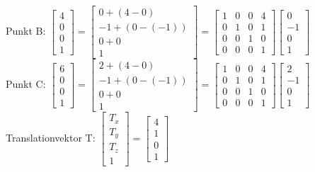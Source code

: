 \documentclass[11pt, a4paper]{article} %
\begin{document}
Punkt B: $\begin{bmatrix}
	4 \\ 0 \\ 0 \\ 1
\end{bmatrix} = \begin{bmatrix}
	0+(4-0) \\ -1+(0-(-1)) \\ 0+0 \\ 1
\end{bmatrix} = \begin{bmatrix}
	1 & 0 & 0 & 4 \\ 0 & 1 & 0 & 1 \\ 0 & 0 & 1 & 0 \\ 0 & 0 & 0 & 1
\end{bmatrix} \begin{bmatrix}
	0 \\ -1 \\ 0 \\ 1
\end{bmatrix}$ \\
Punkt C: $\begin{bmatrix}
	6 \\ 0 \\ 0 \\ 1
\end{bmatrix} = \begin{bmatrix}
	2+(4-0) \\ -1+(0-(-1)) \\ 0+0 \\ 1
\end{bmatrix} = \begin{bmatrix}
	1 & 0 & 0 & 4 \\ 0 & 1 & 0 & 1 \\ 0 & 0 & 1 & 0 \\ 0 & 0 & 0 & 1
\end{bmatrix} \begin{bmatrix}
	2 \\ -1 \\ 0 \\ 1
\end{bmatrix}$ \\
Translationvektor T: $\begin{bmatrix}
	T_x \\ T_y \\ T_z \\ 1
\end{bmatrix} = \begin{bmatrix}
	4 \\ 1 \\ 0 \\ 1
\end{bmatrix}$ \\[0.5cm]
\end{document}
